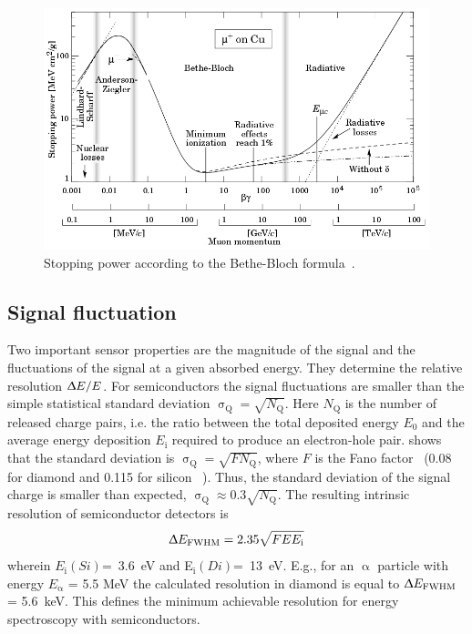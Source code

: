 \begin{figure}[!t]
\begin{center}
\includegraphics[width=0.7\linewidth]{02_pulse_formation/pics/bb2}
\caption{Stopping power according to the Bethe-Bloch formula~\cite{BETHE:00001}.}
\label{fig:bb2}
\end{center}
\end{figure}

\subsection{Signal fluctuation}
Two important sensor properties are the magnitude of the signal and the fluctuations of the signal at a given absorbed energy. They determine the relative resolution $\Updelta E/E$. For semiconductors the signal fluctuations are smaller than the simple statistical standard deviation $\upsigma_\mathrm{Q}=\sqrt{N_\mathrm{Q}}$. Here $N_\mathrm{Q}$ is the number of released charge pairs, i.e. the ratio between the total deposited energy $E_\mathrm{0}$ and the average energy deposition $E_\mathrm{i}$ required to produce an electron-hole pair. \cite{1947PhRv...72...26F} shows that the standard deviation is $\upsigma_\mathrm{Q}=\sqrt{F N_\mathrm{Q}}$, where $F$ is the Fano factor~\cite{1947PhRv...72...26F} (0.08 for diamond and 0.115 for silicon ~\cite{1980PhRvB..22.5565A}). Thus, the standard deviation of the signal charge is smaller than expected, $\upsigma_\mathrm{Q}\approx0.3 \sqrt{N_\mathrm{Q}}$. The resulting intrinsic resolution of semiconductor detectors is 
\begin{equation}
\label{eq:efwhm}
\Updelta E_\mathrm{FWHM} = 2.35 \sqrt{FEE_\mathrm{i}} 
\end{equation} 
wherein $E_\mathrm{i}(Si)$=~3.6~eV and E$_\mathrm{i}(Di)$=~13~eV. E.g., for an $\upalpha$ particle with energy $E_\upalpha$ = 5.5 MeV the calculated resolution in diamond is equal to $\Updelta E_{\mathrm{FWHM}}$ = 5.6~keV. This defines the minimum achievable resolution for energy spectroscopy with semiconductors. 
%


